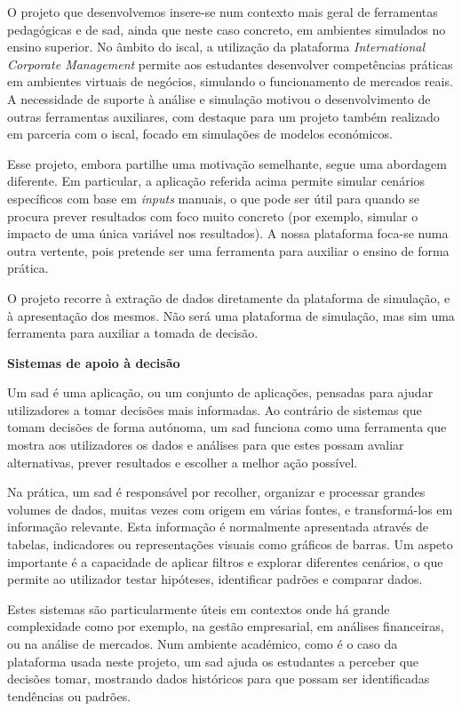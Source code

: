 O projeto que desenvolvemos insere-se num contexto mais geral de ferramentas pedagógicas e de \gls{sad}, ainda que neste caso concreto, em ambientes simulados no ensino superior. No âmbito do \gls{iscal}, a utilização da plataforma \textit{International Corporate Management} \cite{MarketplaceSim_2025} permite aos estudantes desenvolver competências práticas em ambientes virtuais de negócios, simulando o funcionamento de mercados reais. A necessidade de suporte à análise e simulação motivou o desenvolvimento de outras ferramentas auxiliares, com destaque para um projeto também realizado em parceria com o \gls{iscal}, focado em simulações de modelos económicos.

Esse projeto, embora partilhe uma motivação semelhante, segue uma abordagem diferente. Em particular, a aplicação referida acima permite simular cenários específicos com base em \textit{inputs} manuais, o que pode ser útil para quando se procura prever resultados com foco muito concreto (por exemplo, simular o impacto de uma única variável nos resultados). A nossa plataforma foca-se numa outra vertente, pois pretende ser uma ferramenta para auxiliar o ensino de forma prática.

O projeto recorre à extração de dados diretamente da plataforma de simulação, e à apresentação dos mesmos. Não será uma plataforma de simulação, mas sim uma ferramenta para auxiliar a tomada de decisão.

\noindent \textbf{Sistemas de apoio à decisão}
\label{sec:sad}

Um \gls{sad} é uma aplicação, ou um conjunto de aplicações, pensadas para ajudar utilizadores a tomar decisões mais informadas. Ao contrário de sistemas que tomam decisões de forma autónoma, um \gls{sad} funciona como uma ferramenta que mostra aos utilizadores os dados e análises para que estes possam avaliar alternativas, prever resultados e escolher a melhor ação possível.

Na prática, um \gls{sad} é responsável por recolher, organizar e processar grandes volumes de dados, muitas vezes com origem em várias fontes, e transformá-los em informação relevante. Esta informação é normalmente apresentada através de tabelas, indicadores ou representações visuais como gráficos de barras. Um aspeto importante é a capacidade de aplicar filtros e explorar diferentes cenários, o que permite ao utilizador testar hipóteses, identificar padrões e comparar dados.

Estes sistemas são particularmente úteis em contextos onde há grande complexidade como por exemplo, na gestão empresarial, em análises financeiras, ou na análise de mercados. Num ambiente académico, como é o caso da plataforma usada neste projeto, um \gls{sad} ajuda os estudantes a perceber que decisões tomar, mostrando dados históricos para que possam ser identificadas tendências ou padrões.

